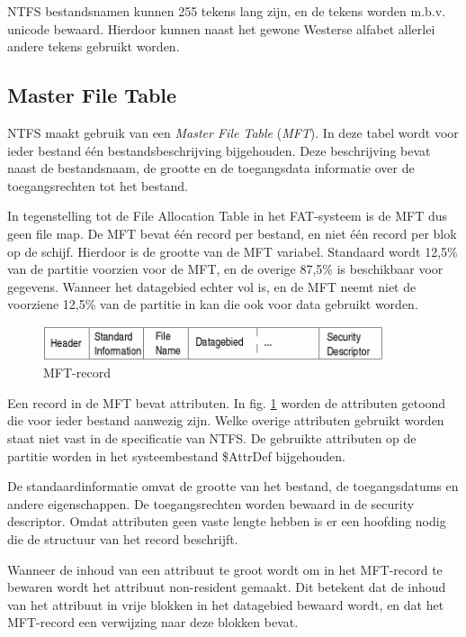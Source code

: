 NTFS bestandsnamen kunnen 255 tekens lang zijn, en de tekens
worden m.b.v. unicode bewaard. Hierdoor kunnen naast het gewone Westerse
alfabet allerlei andere tekens gebruikt worden.

\subsection{Master File Table}

NTFS maakt gebruik van een \emph{Master File
Table} (\emph{MFT}). In deze tabel wordt
voor ieder bestand \'e\'en bestandsbeschrijving bijgehouden. Deze
beschrijving bevat naast de bestandsnaam, de grootte en de
toegangsdata informatie over de toegangsrechten tot het
bestand.

In tegenstelling tot de File Allocation Table in het FAT-systeem
is de MFT dus geen file map. De MFT bevat \'e\'en record per bestand, en
niet \'e\'en record per blok op de schijf. Hierdoor is de grootte van de
MFT variabel. Standaard wordt 12,5\% van de partitie voorzien voor de
MFT, en de overige 87,5\% is beschikbaar voor gegevens. Wanneer het
datagebied echter vol is, en de MFT neemt niet de voorziene 12,5\% van
de partitie in kan die ook voor data gebruikt worden.

\begin{figure}
\begin{center}
\includegraphics[width=100mm]{images/fig0416.png}
\caption{MFT-record}
\label{mftrecord}
\end{center}
\end{figure}

Een record in de MFT bevat attributen. In fig. \ref{mftrecord} worden de
attributen getoond die voor ieder bestand aanwezig zijn. Welke overige attributen
gebruikt worden staat niet vast in de specificatie van NTFS. De
gebruikte attributen op de partitie worden in het systeembestand
\$AttrDef bijgehouden.

De standaardinformatie omvat de grootte van het bestand, de
toegangsdatums en andere eigenschappen. De toegangsrechten worden
bewaard in de security descriptor. Omdat attributen geen vaste lengte
hebben is er een hoofding nodig die de structuur van het record
beschrijft.

Wanneer de inhoud van een attribuut te groot wordt om in het
MFT-record te bewaren wordt het attribuut non-resident gemaakt. Dit
betekent dat de inhoud van het attribuut in vrije blokken in het
datagebied bewaard wordt, en dat het MFT-record een verwijzing naar
deze blokken bevat.

